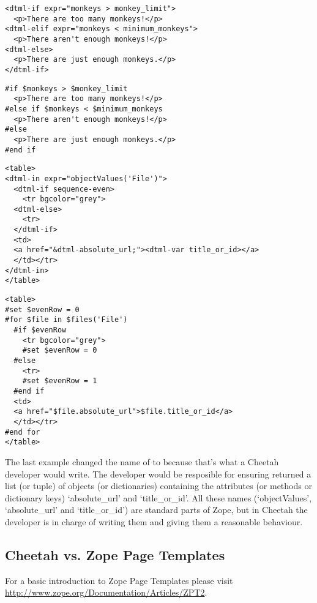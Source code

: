 \begin{verbatim}
<dtml-if expr="monkeys > monkey_limit">
  <p>There are too many monkeys!</p>
<dtml-elif expr="monkeys < minimum_monkeys">
  <p>There aren't enough monkeys!</p>
<dtml-else>
  <p>There are just enough monkeys.</p>
</dtml-if>
\end{verbatim}

\begin{verbatim}
#if $monkeys > $monkey_limit
  <p>There are too many monkeys!</p>
#else if $monkeys < $minimum_monkeys
  <p>There aren't enough monkeys!</p>
#else
  <p>There are just enough monkeys.</p>
#end if
\end{verbatim}

\begin{verbatim}
<table>
<dtml-in expr="objectValues('File')">
  <dtml-if sequence-even>
    <tr bgcolor="grey">
  <dtml-else>
    <tr>
  </dtml-if>    
  <td>
  <a href="&dtml-absolute_url;"><dtml-var title_or_id></a>
  </td></tr>
</dtml-in>
</table>
\end{verbatim}

\begin{verbatim}
<table>
#set $evenRow = 0
#for $file in $files('File')
  #if $evenRow
    <tr bgcolor="grey">
    #set $evenRow = 0
  #else
    <tr>
    #set $evenRow = 1
  #end if
  <td>
  <a href="$file.absolute_url">$file.title_or_id</a>
  </td></tr>
#end for
</table>
\end{verbatim}

The last example changed the name of  to 
 because that's what a Cheetah developer would write.
The developer would be resposible for ensuring  returned a 
list (or tuple) of objects (or dictionaries) containing the attributes (or
methods or dictionary keys) `absolute\_url' and `title\_or\_id'.  All these
names (`objectValues', `absolute\_url' and `title\_or\_id') are standard parts
of Zope, but in Cheetah the developer is in charge of writing them and giving
them a reasonable behaviour.

\subsection{Cheetah vs. Zope Page Templates}
\label{comparisons.zpt}

For a basic introduction to Zope Page Templates please visit
\url{http://www.zope.org/Documentation/Articles/ZPT2}.

